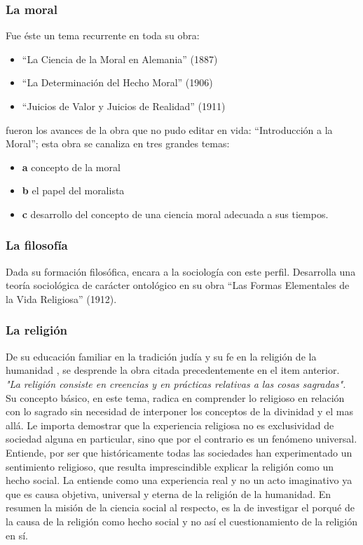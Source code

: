 \subsubsection{La moral}
		Fue éste un tema recurrente en toda su obra:
		\begin{itemize}
			\item ``La Ciencia de la Moral en Alemania'' (1887)
			\item ``La Determinación del Hecho Moral'' (1906)
			\item ``Juicios de Valor y Juicios de Realidad'' (1911)
		\end{itemize}
		fueron los avances de la obra que no pudo editar en vida: ``Introducción a la Moral'';
		esta obra se canaliza en tres grandes temas:
		\begin{itemize}
			\item \textbf{a} concepto de la moral
			\item \textbf{b} el papel del moralista
			\item \textbf{c} desarrollo del concepto de una ciencia moral adecuada a sus tiempos.
		\end{itemize}
\subsubsection{La filosofía}
		Dada su formación filosófica, encara a la sociología con este perfil. Desarrolla una teoría sociológica de carácter
		ontológico en su obra ``Las Formas Elementales de la Vida Religiosa'' (1912).
\subsubsection{La religión}
		De su educación familiar en la tradición judía y su fe en la religión de la humanidad , se desprende la obra citada
		precedentemente en el item anterior.\\
		\emph{"La religión consiste en creencias y en prácticas relativas a las cosas sagradas".}\\
		Su concepto básico, en este tema, radica en comprender lo religioso en relación con lo sagrado sin necesidad de interponer
		los conceptos de la divinidad y el mas allá.
		Le importa demostrar que la experiencia religiosa no es exclusividad de sociedad alguna en particular, sino que por el
		contrario es un fenómeno universal.
		Entiende, por ser que históricamente todas las sociedades han experimentado un sentimiento religioso, que resulta
		imprescindible explicar la religión como un hecho social. La entiende como una experiencia real y no un acto imaginativo
		ya que es causa objetiva, universal y eterna de la religión de la humanidad.
		En resumen la misión de la ciencia social al respecto, es la de investigar el porqué de la causa de la religión como hecho
		social y no así el cuestionamiento de la religión en sí.
\newpage


